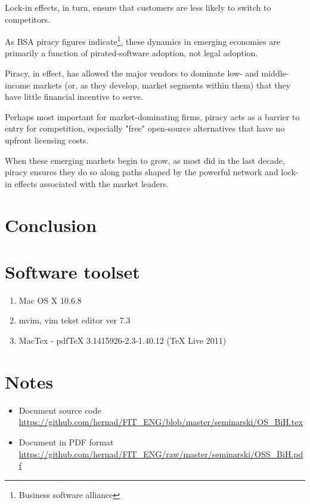 \documentclass[times, utf8, seminar]{fit}
\begin{document}
Lock-in effects, in turn, ensure that customers are less likely to switch to competitors.

As BSA piracy figures indicate\footnote{Business software alliance}, these dynamics in emerging economies are primarily a function of pirated-software adoption, not legal adoption.

Piracy, in effect, has allowed the major vendors to dominate low- and middle-income markets (or, as they develop, market segments within them) that they have little financial incentive to serve.

Perhaps most important for market-dominating firms, piracy acts as a barrier to entry for competition, especially "free" open-source alternatives that have no upfront licensing costs.

When these emerging markets begin to grow, as most did in the last decade, piracy ensures they do so along paths shaped by the powerful network and lock-in effects associated with the market leaders.\citep{mediapiracy}


\chapter{Conclusion}




\appendix

\chapter{Software toolset}
\begin{enumerate}
  \item Mac OS X 10.6.8
  \item mvim, vim tekst editor ver 7.3
  \item MacTex - pdfTeX 3.1415926-2.3-1.40.12 (TeX Live 2011)
\end{enumerate}

\chapter{Notes}

\begin{itemize}
  \item Document source code \url{https://github.com/hernad/FIT_ENG/blob/master/seminarski/OS_BiH.tex}
  \item Document in PDF format \url{https://github.com/hernad/FIT_ENG/raw/master/seminarski/OSS_BiH.pdf}
\end{itemize}
\end{document}
